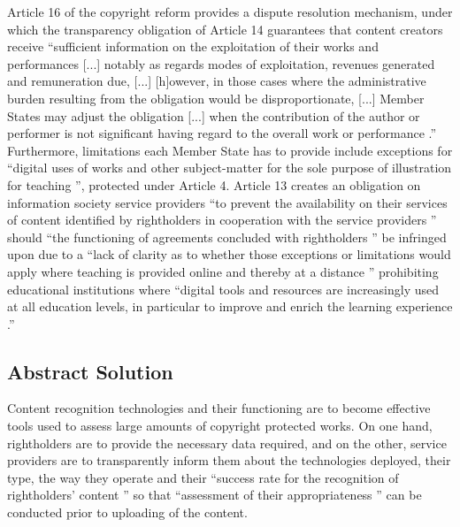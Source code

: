 \documentclass[a4paper]{article}
\begin{document}
Article 16 of the copyright reform provides a dispute resolution mechanism, under which the transparency obligation of Article 14 guarantees that content creators receive ``sufficient information on the exploitation of their works and performances [...] notably as regards modes of exploitation, revenues generated and remuneration due, [...] [h]owever, in those cases where the administrative burden resulting from the obligation would be disproportionate, [...] Member States may adjust the obligation [...] when the contribution of the author or performer is not significant having regard to the overall work or performance \cite{Copyright Reform}.'' Furthermore, limitations each Member State has to provide include exceptions for ``digital uses of works and other subject-matter for the sole purpose of illustration for teaching \cite{Copyright Reform}'', protected under Article 4. Article 13 creates an obligation on information society service providers ``to prevent the availability on their services of content identified by rightholders in cooperation with the service providers \cite{Copyright Reform}'' should ``the functioning of agreements concluded with rightholders \cite{Copyright Reform}'' be infringed upon due to a ``lack of clarity as to whether those exceptions or limitations would apply where teaching is provided online and thereby at a distance \cite{Copyright Reform}'' prohibiting educational institutions where ``digital tools and resources are increasingly used at all education levels, in  particular to improve and enrich the learning experience \cite{Copyright Reform}.'' 

\subsection{Abstract Solution}

Content recognition technologies and their functioning are to become effective tools used to assess large amounts of copyright protected works. On one hand, rightholders are to provide the necessary data required, and on the other, service providers are to transparently inform them about the technologies deployed, their type, the way they operate and their ``success rate for the recognition of rightholders' content \cite{Copyright Reform}'' so that ``assessment of their appropriateness \cite{Copyright Reform}'' can be conducted prior to uploading of the content. \\
\end{document}
